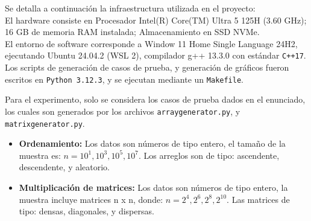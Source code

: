 Se detalla a continuación la infraestructura utilizada en el proyecto:\\
El hardware consiste en Procesador Intel(R) Core(TM) Ultra 5 125H (3.60 GHz); 16 GB de memoria RAM instalada; Almacenamiento en SSD NVMe.\\
El entorno de software corresponde a Window 11 Home Single Language 24H2, ejecutando Ubuntu 24.04.2 (WSL 2), compilador g++ 13.3.0 con estándar \texttt{C++17}. Los scripts de generación de casos de prueba, y generación de gráficos fueron escritos en \texttt{Python 3.12.3}, y se ejecutan mediante un \texttt{Makefile}.

Para el experimento, solo se considera los casos de prueba dados en el enunciado, los cuales son generados por los archivos \texttt{arraygenerator.py}, y \texttt{matrixgenerator.py}.
\begin{itemize}
  \item \textbf{Ordenamiento:} Los datos son números de tipo entero, el tamaño de la muestra es:  $n = {10^{1}, 10^{3}, 10^{5}, 10^{7}}$. Los arreglos son de tipo: ascendente, descendente, y aleatorio.
  \item \textbf{Multiplicación de matrices:} Los datos son números de tipo entero, la muestra incluye matrices n x n, donde: $n = {2^{4}, 2^{6}, 2^{8}, 2^{10}}$. Las matrices de tipo: densas, diagonales, y dispersas.
\end{itemize}
